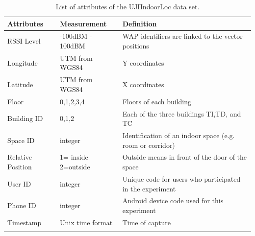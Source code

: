 \begin{table}[!ht]
\centering
\caption{ List of attributes of the UJIIndoorLoc data set.}
\small
    \begin{tabular}{ p{4cm} p{4.5cm} p{4.5cm} }
    \hline
    \textbf{Attributes} & \textbf{Measurement} & \textbf{Definition} \\ \hline
    \midrule
    RSSI Level             &    -100dBM - 100dBM    & WAP identifiers are linked to the vector positions           
    \\\hline
    Longitude              &    UTM from WGS84     &  Y coordinates           \\\hline
    Latitude               &    UTM from WGS84     &  X coordinates          \\\hline
    Floor                  &    0,1,2,3,4     &  Floors of each building           
    \\\hline
    Building ID            &    0,1,2     &  Each of the three buildings TI,TD, and TC          
    \\\hline
    Space ID               &    integer   & Identification of an indoor space (e.g. room or corridor)            
    \\\hline
    Relative Position      &    1= inside 2=outside       & Outside means in front of the door of the space \\\hline
    User ID                &    integer    &  Unique code for users who participated in the experiment           \\\hline
    Phone ID               &    integer      &    Android device code used for this experiment        \\\hline
    Timestamp              &    Unix time format      &  Time of capture           
    \\
    \bottomrule
\label{featuj}
\end{tabular}
\end{table}



